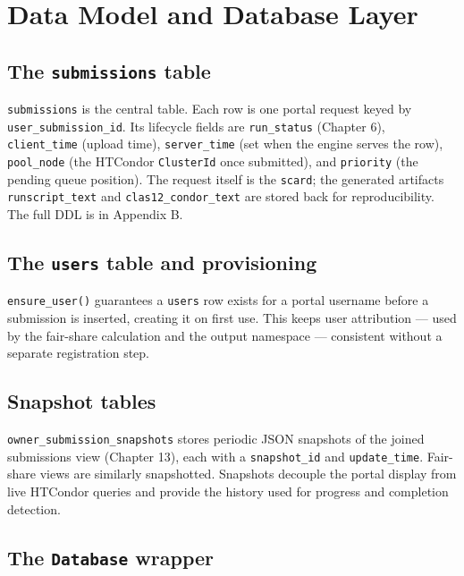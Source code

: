 \section{Data Model and Database Layer}\label{ch:5}

\subsection{The \texttt{submissions} table}

\texttt{submissions} is the central table. Each row is one portal request keyed by
\texttt{user\_\allowbreak{}submission\_\allowbreak{}id}. Its lifecycle fields are
\texttt{run\_\allowbreak{}status} (Chapter 6), \texttt{client\_\allowbreak{}time} (upload time),
\texttt{server\_\allowbreak{}time} (set when the engine serves the row), \texttt{pool\_\allowbreak{}node} (the
HTCondor \texttt{ClusterId} once submitted), and \texttt{priority} (the pending queue position). The request
itself is the \texttt{scard}; the generated artifacts \texttt{runscript\_\allowbreak{}text} and
\texttt{clas12\_\allowbreak{}condor\_\allowbreak{}text} are stored back for reproducibility. The full DDL is in
Appendix B.

\subsection{The \texttt{users} table and provisioning}

\texttt{ensure\_\allowbreak{}user()} guarantees a \texttt{users} row exists for a portal username before a
submission is inserted, creating it on first use. This keeps user attribution --- used by the fair-share
calculation and the output namespace --- consistent without a separate registration step.

\subsection{Snapshot tables}

\texttt{owner\_\allowbreak{}submission\_\allowbreak{}snapshots} stores periodic JSON snapshots of the joined
submissions view (Chapter 13), each with a \texttt{snapshot\_\allowbreak{}id} and
\texttt{update\_\allowbreak{}time}. Fair-share views are similarly snapshotted. Snapshots decouple the portal
display from live HTCondor queries and provide the history used for progress and completion detection.

\subsection{The \texttt{Database} wrapper}

